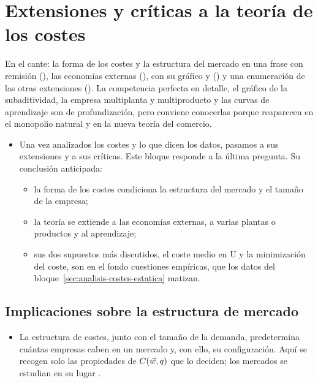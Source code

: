 \documentclass[11pt]{article}
\begin{document}
\section{Extensiones y críticas a la teoría de los costes}\label{sec:extensiones-criticas-teoria}

\begin{notaopositor}
En el cante: la forma de los costes y la estructura del mercado en una frase con remisión (), las economías externas (),  con su gráfico y  () y una enumeración de las otras extensiones (). La competencia perfecta en detalle, el gráfico de la subaditividad, la empresa multiplanta y multiproducto y las curvas de aprendizaje son de profundización, pero conviene conocerlas porque reaparecen en el monopolio natural y en la nueva teoría del comercio.
\end{notaopositor}

\begin{itemize}
\item Una vez analizados los costes y lo que dicen los datos, pasamos a sus extensiones y a sus críticas. Este bloque responde a la última pregunta. Su conclusión anticipada:
  \begin{itemize}
  \item la forma de los costes condiciona la estructura del mercado y el tamaño de la empresa;
  \item la teoría se extiende a las economías externas, a varias plantas o productos y al aprendizaje;
  \item sus dos supuestos más discutidos, el coste medio en U y la minimización del coste, son en el fondo cuestiones empíricas, que los datos del bloque~\ref{sec:analisis-costes-estatica} matizan.
  \end{itemize}
\end{itemize}

\subsection{Implicaciones sobre la estructura de mercado}\label{sec:implicaciones-estructura-mercado}

\begin{itemize}
\item La estructura de costes, junto con el tamaño de la demanda, predetermina cuántas empresas caben en un mercado y, con ello, su configuración. Aquí se recogen solo las propiedades de $C(\vec{w},q)$ que lo deciden; los mercados se estudian en su lugar  .
\end{itemize}
\end{document}
